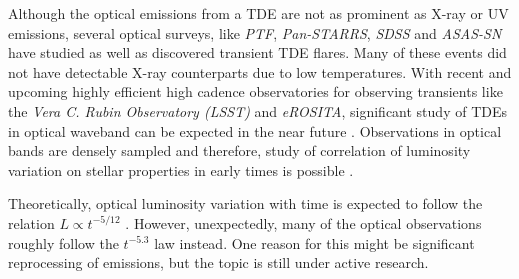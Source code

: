 \documentclass{tda}
\begin{document}
Although the optical emissions from a TDE are not as prominent as X-ray or UV emissions, several optical surveys, like \textit{PTF}, \textit{Pan-STARRS}, \textit{SDSS} and \textit{ASAS-SN} have studied as well as discovered transient TDE flares. Many of these events did not have detectable X-ray counterparts due to low temperatures. With recent and upcoming highly efficient high cadence observatories for observing transients like the \textit{Vera C. Rubin Observatory (LSST)} and \textit{eROSITA}, significant study of TDEs in optical waveband can be expected in the near future \cite{strubbe_optical_2009}. Observations in optical bands are densely sampled and therefore, study of correlation of luminosity variation on stellar properties in early times is possible \cite{gezari_tidal_2013}.

Theoretically, optical luminosity variation with time is expected to follow the relation \(L \propto t^{-5/12}\) \cite{lodato_multiband_2011}. However, unexpectedly, many of the optical observations roughly follow the \(t^{-5.3}\) law instead. One reason for this might be significant reprocessing of emissions, but the topic is still under active research.
\end{document}
